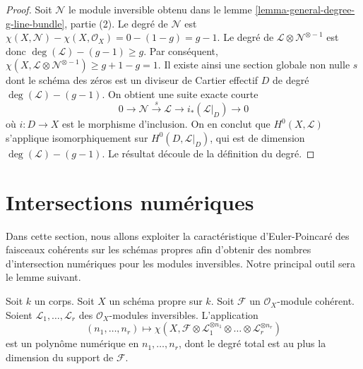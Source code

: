 \begin{proof}
Soit $\mathcal{N}$ le module inversible obtenu dans
le lemme \ref{lemma-general-degree-g-line-bundle}, partie (2).
Le degré de $\mathcal{N}$ est
$\chi(X, \mathcal{N}) - \chi(X, \mathcal{O}_X) = 0 - (1 - g) = g - 1$.
Le degré de $\mathcal{L} \otimes \mathcal{N}^{\otimes - 1}$
est donc $\deg(\mathcal{L}) - (g - 1) \geq g$.
Par conséquent,
$\chi(X, \mathcal{L} \otimes \mathcal{N}^{\otimes -1}) \geq g + 1 - g = 1$.
Il existe ainsi une section globale non nulle $s$ dont le schéma des zéros est un
diviseur de Cartier effectif $D$ de degré $\deg(\mathcal{L}) - (g - 1)$.
On obtient une suite exacte courte
$$
0 \to \mathcal{N} \xrightarrow{s} \mathcal{L} \to i_*(\mathcal{L}|_D) \to 0
$$
où $i : D \to X$ est le morphisme d'inclusion. On en conclut que
$H^0(X, \mathcal{L})$ s'applique isomorphiquement sur $H^0(D, \mathcal{L}|_D)$,
qui est de dimension $\deg(\mathcal{L}) - (g - 1)$. Le résultat découle
de la définition du degré.
\end{proof}






\section{Intersections numériques}
\label{section-num}

\noindent
Dans cette section, nous allons exploiter la caractéristique d'Euler-Poincaré des
faisceaux cohérents sur les schémas propres afin d'obtenir des nombres d'intersection
numériques pour les modules inversibles. Notre principal outil sera le
lemme suivant.

\begin{lemma}
\label{lemma-numerical-polynomial-from-euler}
Soit $k$ un corps. Soit $X$ un schéma propre sur $k$. Soit $\mathcal{F}$
un $\mathcal{O}_X$-module cohérent. Soient
$\mathcal{L}_1, \ldots, \mathcal{L}_r$ des $\mathcal{O}_X$-modules inversibles.
L'application
$$
(n_1, \ldots, n_r) \longmapsto
\chi(X, \mathcal{F} \otimes
\mathcal{L}_1^{\otimes n_1} \otimes \ldots \otimes
\mathcal{L}_r^{\otimes n_r})
$$
est un polynôme numérique en $n_1, \ldots, n_r$, dont le degré total est au
plus la dimension du support de $\mathcal{F}$.
\end{lemma}

